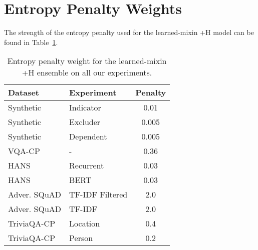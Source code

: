 \documentclass[11pt,a4paper]{article}
\begin{document}



\appendix
\section{Entropy Penalty Weights}
\label{appendix:penalty_weights}
The strength of the entropy penalty used for the learned-mixin +H model can be found in Table~\ref{tab:hyperparameters}.

\begin{table}[]
    \centering
    \begin{tabular}{l|l|c}
        Dataset & Experiment & Penalty \\ \hline
        Synthetic & Indicator & 0.01 \\
        Synthetic & Excluder & 0.005 \\
        Synthetic & Dependent & 0.005 \\
        VQA-CP & - & 0.36 \\
        HANS & Recurrent & 0.03 \\
        HANS & BERT & 0.03 \\
        Adver. SQuAD & TF-IDF Filtered & 2.0 \\
        Adver. SQuAD & TF-IDF & 2.0 \\
        TriviaQA-CP & Location & 0.4 \\
        TriviaQA-CP & Person & 0.2 \\
    \end{tabular}
    \caption{Entropy penalty weight for the learned-mixin +H ensemble on all our experiments.}
    \label{tab:hyperparameters}
\end{table}
\end{document}

